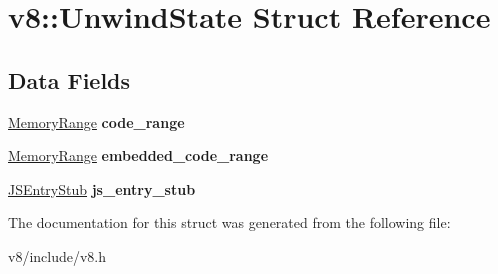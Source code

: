 \hypertarget{structv8_1_1UnwindState}{}\section{v8\+:\+:Unwind\+State Struct Reference}
\label{structv8_1_1UnwindState}
\subsection*{Data Fields}
\begin{DoxyCompactItemize}
\item 
\mbox{\label{structv8_1_1UnwindState_a6928337ceb50f5ca7ac6ea9c2b5e79c9}} 
\mbox{\hyperlink{structv8_1_1MemoryRange}{Memory\+Range}} {\bfseries code\+\_\+range}
\item 
\mbox{\label{structv8_1_1UnwindState_af491a7ed0095d588e65346d2d47aeb10}} 
\mbox{\hyperlink{structv8_1_1MemoryRange}{Memory\+Range}} {\bfseries embedded\+\_\+code\+\_\+range}
\item 
\mbox{\label{structv8_1_1UnwindState_a6524b94b4e4530111fe284ba773aad35}} 
\mbox{\hyperlink{structv8_1_1JSEntryStub}{J\+S\+Entry\+Stub}} {\bfseries js\+\_\+entry\+\_\+stub}
\end{DoxyCompactItemize}


The documentation for this struct was generated from the following file\+:\begin{DoxyCompactItemize}
\item 
v8/include/v8.\+h\end{DoxyCompactItemize}
